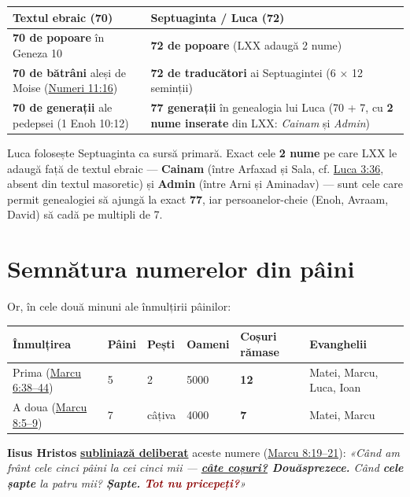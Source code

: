 \documentclass[12pt,a4paper,twoside,openany]{book}
\begin{document}
\begin{center}
\small
\begin{tabular}{L{5.1cm}L{10.0cm}}
\toprule
{}
\textbf{Textul ebraic (70)} & \textbf{Septuaginta / Luca (72)} \\
\midrule
\textbf{70 de popoare} în Geneza 10 & \textbf{72 de popoare} (LXX adaugă 2 nume) \\
\textbf{70 de bătrâni} aleși de Moise (\href{https://bibliaortodoxa.ro/carte.php?id=59\&cap=11\#16}{Numeri 11:16}) & \textbf{72 de traducători} ai Septuagintei (6 × 12 seminții) \\
\textbf{70 de generații} ale pedepsei (1 Enoh 10:12) & \textbf{77 generații} în genealogia lui Luca (70 + 7, cu \textbf{2 nume inserate} din LXX: \textit{Cainam} și \textit{Admin}) \\
\bottomrule
\end{tabular}
\end{center}
\normalsize
Luca folosește Septuaginta ca sursă primară. Exact cele \textbf{2 nume} pe care LXX le adaugă față de textul ebraic — \textbf{Cainam} (între Arfaxad și Sala, cf. \href{https://bibliaortodoxa.ro/carte.php?id=48\&cap=3\#36}{Luca 3:36}, absent din textul masoretic) și \textbf{Admin} (între Arni și Aminadav) — sunt cele care permit genealogiei să ajungă la exact \textbf{77}, iar persoanelor-cheie (Enoh, Avraam, David) să cadă pe multipli de 7.


\section{Semnătura numerelor din pâini}
Or, în cele două minuni ale înmulțirii pâinilor:

\footnotesize
\begin{longtable}{L{4.0cm}L{0.9cm}L{1.1cm}L{1.1cm}L{2.5cm}L{4.6cm}}
\toprule
{}
\textbf{Înmulțirea} & \textbf{Pâini} & \textbf{Pești} & \textbf{Oameni} & \textbf{Coșuri rămase} & \textbf{Evanghelii} \\
\midrule
\endhead
Prima (\href{https://bibliaortodoxa.ro/carte.php?id=53\&cap=6\#38}{Marcu 6:38–44}) & 5 & 2 & 5000 & \textbf{12} & Matei, Marcu, Luca, Ioan \\
A doua (\href{https://bibliaortodoxa.ro/carte.php?id=53\&cap=8\#5}{Marcu 8:5–9}) & 7 & câțiva & 4000 & \textbf{7} & Matei, Marcu \\
\bottomrule
\end{longtable}
\normalsize
\textbf{Iisus Hristos} \textbf{\underline{subliniază deliberat}} aceste numere (\href{https://bibliaortodoxa.ro/carte.php?id=53\&cap=8\#19}{Marcu 8:19–21}): \textit{«Când am frânt cele cinci pâini la cei cinci mii — \textbf{\underline{câte coșuri?} Douăsprezece.} Când \textbf{cele șapte} la patru mii? \textbf{Șapte.} \textcolor{darkred}{\textbf{Tot nu pricepeți?}}»}
\end{document}

